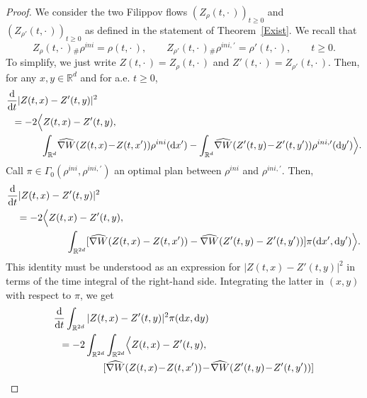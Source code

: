 \documentclass[11pt]{article}
\theoremstyle{definition}
\numberwithin{equation}{section}
\newcommand*{\dd}{\mathrm{d}}
\newcommand*{\dt}{\dd t}
\newcommand*{\dx}{\dd x}
\newcommand*{\dy}{\dd y}
\newcommand*\RR{\mathbb{R}}
\begin{document}
\begin{proof}
We consider the two Filippov flows $(Z_{\rho}(t,{\cdot\,}))_{t \geq 0}$ and $(Z_{\rho'}(t,{\cdot\,}))_{t \geq 0}$ as defined in the statement of Theorem~\ref{Exist}. We recall that
\begin{equation}\label{eq:aux:proof}
Z_{\rho}(t,{\cdot\,}){}_{\#} \rho^{ini}=
\rho(t,{\cdot\,}), \qquad Z_{\rho'}(t,{\cdot\,}){}_{\#} \rho^{ini,\prime}=
\rho'(t,{\cdot\,}), \qquad t \geq 0.
\end{equation}
To simplify, we just write $Z(t,{\cdot\,}) = Z_{\rho}(t,{\cdot\,})$ and $Z'(t,{\cdot\,}) = Z_{\rho'}(t,{\cdot\,})$. Then, for any $x,y \in \RR^d$ and for a.e. $t \geq 0$,
\begin{equation*}
\begin{split}
&\frac{\dd}{\dt} \vert Z(t,x) - Z'(t,y) \vert^2
\\
&\;\;= - 2 \Bigl\langle Z(t,x) - Z'(t,y),
\\
&\qquad\quad\;\; \int_{\RR^d}\!
\widehat{\nabla W}(Z(t,x) \!-\! Z(t,x') ) \rho^{ini}(\dx') -
\int_{\RR^d}\!
\widehat{\nabla W}(Z'(t,y) \!-\! Z'(t,y') ) \rho^{ini,\prime}(\dy')
\Bigr\rangle.
\end{split}
\end{equation*}
Call $\pi \in \Gamma_{0}(\rho^{ini},\rho^{ini,\prime})$ an optimal plan between $\rho^{ini}$ and $\rho^{ini,\prime}$. Then,
\begin{equation*}
\begin{split}
&\frac{\dd}{\dt} \vert Z(t,x) - Z'(t,y) \vert^2\\
&\quad = - 2 \Bigl\langle Z(t,x) - Z'(t,y),\\
&\qquad\qquad\qquad
\int_{\RR^{2d}}
[\widehat{\nabla W}(Z(t,x) - Z(t,x') ) -
\widehat{\nabla W}(Z'(t,y) - Z'(t,y') ) ]
\pi(\dx',\dy')
\Bigr\rangle.
\end{split}
\end{equation*}
This identity must be understood as an expression for $|Z(t,x) - Z'(t,y)|^2$ in terms of the time integral of the right-hand side. Integrating the latter in $(x,y)$ with respect to $\pi$, we get
\begin{equation*}
\begin{split}
&\frac{\dd}{\dt} \int_{\RR^{2d}} \vert Z(t,x) - Z'(t,y) \vert^2
\pi(\dx,\dy)
\\
&\;\; =- 2
\int_{\RR^{2d}}
\int_{\RR^{2d}}
\Bigl\langle Z(t,x) - Z'(t,y),
\\
&\qquad\qquad\quad
[
\widehat{\nabla W}(Z(t,x) \!-\! Z(t,x') ) \!-\!
\widehat{\nabla W}(Z'(t,y) \!-\! Z'(t,y') ) ]

\end{split}
\end{equation*}
\end{proof}
\end{document}
